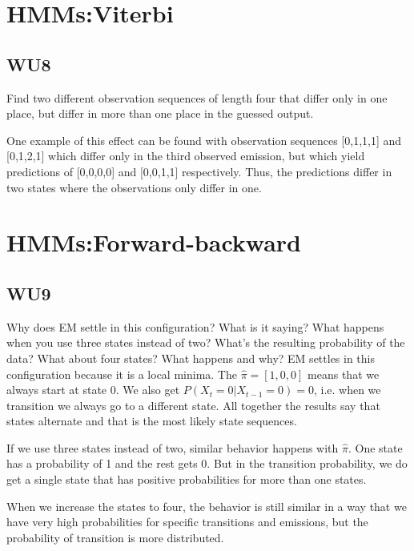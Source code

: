 \documentclass[a4paper,11pt]{article}
\begin{document}
\section{HMMs:Viterbi}
\subsection{WU8}
\textsf{Find two different observation sequences of length four that
differ only in one place, but differ in more than one place in the
guessed output.}\vspace{0.1in}


One example of this effect can be found with observation sequences
[0,1,1,1] and [0,1,2,1] which differ only in the third observed emission,
but which yield predictions of [0,0,0,0] and [0,0,1,1] respectively.
Thus, the predictions differ in two states where the observations only
differ in one.

\section{HMMs:Forward-backward}
\subsection{WU9}
\textsf{Why does EM settle in this configuration? What is it saying? 
What happens when you use three states instead of two? 
What's the resulting probability of the data? 
What about four states? What happens and why?}\vspace{0.1in}
EM settles in this configuration because it is a local minima. The
$\hat \pi = [1,0,0]$ means that we always start at state 0. We also get $P(X_t=0|X_{t-1}=0)= 0$,
i.e. when we transition we always go to a different state. All
together the results say that states alternate and that is the most
likely state sequences.

If we use three states instead of two, similar behavior happens with
$\hat \pi$. One state has a probability of 1 and the rest gets 0. But
in the transition probability, we do get a single state that
has positive probabilities for more than one states.

When we increase the states to four, the behavior is still similar in
a way that we have very high probabilities for specific transitions
and emissions, but the probability of transition is more distributed.
\end{document}
